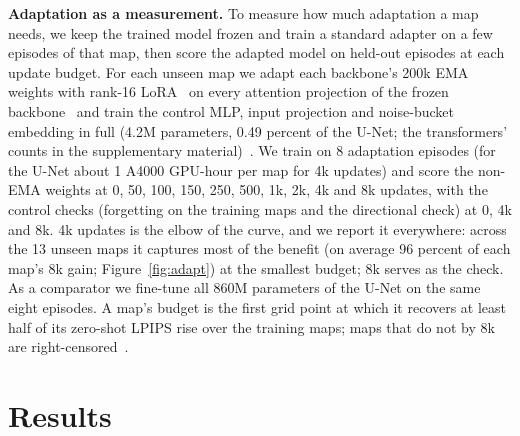 \documentclass{article}
\newif\ifwithappendix \withappendixfalse %
\newcommand{\appref}[1]{\ifwithappendix Appendix~\ref{#1}\else the supplementary material\fi}
\begin{document}
\textbf{Adaptation as a measurement.} To measure how much adaptation a map needs, we keep the trained model frozen and train a standard adapter on a few episodes of that map, then score the adapted model on held-out episodes at each update budget.
For each unseen map we adapt each backbone's 200k EMA weights with rank-16 LoRA~\citep{hu2022lora} on every attention projection of the frozen backbone~\citep{gao2024vista} and train the control MLP, input projection and noise-bucket embedding in full (4.2M parameters, 0.49 percent of the U-Net; the transformers' counts in \appref{app:perarena-adapt})~\citep{xie2023difffit}.
We train on 8 adaptation episodes (for the U-Net about 1 A4000 GPU-hour per map for 4k updates) and score the non-EMA weights at 0, 50, 100, 150, 250, 500, 1k, 2k, 4k and 8k updates, with the control checks (forgetting on the training maps and the directional check) at 0, 4k and 8k. 4k updates is the elbow of the curve, and we report it everywhere: across the 13 unseen maps it captures most of the benefit (on average 96 percent of each map's 8k gain; Figure~\ref{fig:adapt}) at the smallest budget; 8k serves as the check. As a comparator we fine-tune all 860M parameters of the U-Net on the same eight episodes.
A map's budget is the first grid point at which it recovers at least half of its zero-shot LPIPS rise over the training maps; maps that do not by 8k are right-censored~\citep{taylor2009transfer}.



\section{Results}
\label{sec:results}
\begin{table}[t]
\centering\footnotesize

\label{tab:unseen}
{\scriptsize\setlength{\tabcolsep}{2.5pt}}
\end{table}
\end{document}
